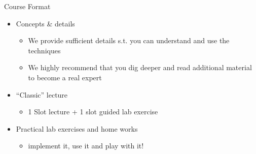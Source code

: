 \documentclass[aspectratio=169]{../latex_main/tntbeamer}  %
\begin{document}
\begin{frame}[c]{Course Format}

\begin{itemize}
	\item Concepts \& details
	\begin{itemize}
	  \item We provide sufficient details s.t. you can understand and use the techniques
	  \item We highly recommend that you dig deeper and read additional material to become a real expert
	\end{itemize}
	\smallskip
	\item ``Classic'' lecture
	\begin{itemize}
	  \item 1 Slot lecture + 1 slot guided lab exercise
	\end{itemize}
	\smallskip
	\item Practical lab exercises and home works
	\begin{itemize}
	  \item implement it, use it and play with it!
	\end{itemize}
\end{itemize}

\end{frame}
\end{document}
